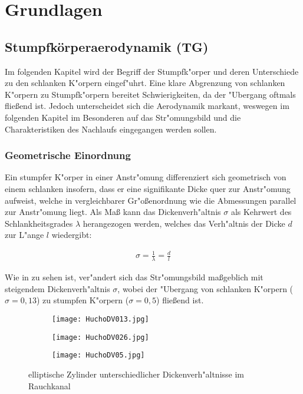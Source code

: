 \chapter{Grundlagen}\label{s:grundlagen}

\section{Stumpfk\"orperaerodynamik (TG)}


Im folgenden Kapitel wird der Begriff der Stumpfk"orper und deren Unterschiede zu den schlanken K"orpern eingef"uhrt. Eine klare Abgrenzung von schlanken K"orpern zu Stumpfk"orpern bereitet Schwierigkeiten, da der "Ubergang oftmals flie\ss{}end ist. Jedoch unterscheidet sich die Aerodynamik markant, weswegen im folgenden Kapitel im Besonderen auf das Str"omungsbild und die Charakteristiken des Nachlaufs eingegangen werden sollen.

\subsection{Geometrische Einordnung}
\label{sec:Geometrie}
Ein stumpfer K"orper in einer Anstr"omung differenziert sich geometrisch von einem schlanken insofern, dass er eine signifikante Dicke quer zur Anstr"omung aufweist, welche in vergleichbarer Gr"o\ss{}enordnung wie die Abmessungen parallel zur Anstr"omung liegt. Als Ma\ss{} kann das Dickenverh"altnis $\sigma$ als Kehrwert des Schlankheitsgrades $\lambda$ herangezogen werden, welches das Verh"altnis der Dicke $d$ zur L"ange $l$ wiedergibt:

\begin{align}
\sigma = \frac{1}{\lambda} = \frac{d}{l}
\end{align}

Wie in  zu sehen ist, ver"andert sich das Str"omungsbild ma\ss{}geblich mit steigendem Dickenverh"altnis $\sigma$, wobei der "Ubergang von schlanken K"orpern ($\sigma = 0,13$) zu stumpfen K"orpern ($\sigma = 0,5$) flie\ss{}end ist.

\begin{figure}[h]
	\centering
	\begin{subfigure}[c]{0.45\textwidth}		
		\texttt{[image: HuchoDV013.jpg]}
	\end{subfigure}
	\begin{subfigure}[c]{0.45\textwidth}
		\texttt{[image: HuchoDV026.jpg]}
	\end{subfigure}
	\begin{subfigure}[c]{0.45\textwidth}
		\texttt{[image: HuchoDV05.jpg]}
	\end{subfigure}
	\caption{elliptische Zylinder unterschiedlicher Dickenverh"altnisse im Rauchkanal \cite{Hucho.2011}}
	\label{fig:HuchoDV}
\end{figure}


